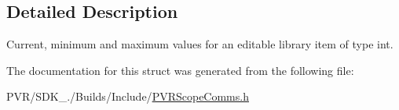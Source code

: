 \subsection{Detailed Description}
Current, minimum and maximum values for an editable library item of type int. 



 

The documentation for this struct was generated from the following file\+:\begin{DoxyCompactItemize}
\item 
P\+V\+R/\+S\+D\+K\+\_./\+Builds/\+Include/\hyperlink{_p_v_r_scope_comms_8h}{P\+V\+R\+Scope\+Comms.\+h}\end{DoxyCompactItemize}
